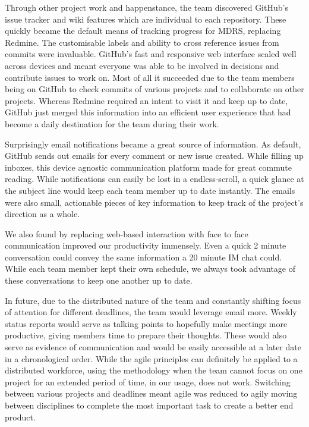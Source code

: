 \documentclass{l3proj}
\begin{document}
Through other project work and happenstance, the team discovered GitHub's issue
tracker and wiki features which are individual to each repository. These quickly
became the default means of tracking progress for MDRS, replacing Redmine. The
customisable labels and ability to cross reference issues from commits were
invaluable. GitHub's fast and responsive web interface scaled well across
devices and meant everyone was able to be involved in decisions and contribute
issues to work on. Most of all it succeeded due to the team members being on GitHub to check commits of various projects and to collaborate on other projects. Whereas Redmine required an intent to visit it and keep up to date, GitHub just merged this information into an efficient user experience that had become a daily destination for the team during their work.

Surprisingly email notifications became a great source of information. As
default, GitHub sends out emails for every comment or new issue created. While
filling up inboxes, this device agnostic communication platform made for great
commute reading. While notifications can easily be lost in a endless-scroll, a quick glance at the subject line would keep each team member up to date instantly. The
emails were also small, actionable pieces of key information to keep track of the
project's direction as a whole.

We also found by replacing web-based interaction with face to face communication improved our productivity immensely. Even a quick 2 minute conversation could convey the same information a 20 minute IM chat could. While each team member kept their own schedule, we always took advantage of these conversations to keep one another up to date.

In future, due to the distributed nature of the team and constantly shifting
focus of attention for different deadlines, the team would leverage email more.
Weekly status reports would serve as talking points to hopefully make meetings
more productive, giving members time to prepare their thoughts. These would also
serve as evidence of communication and would be easily accessible at a later
date in a chronological order. While the agile principles can definitely be applied to a distributed workforce, using the methodology when the team cannot focus on one project for an extended period of time, in our usage, does not work. Switching between various projects and deadlines meant agile was reduced to agily moving between disciplines to complete the most important task to create a better end product.
\end{document}
